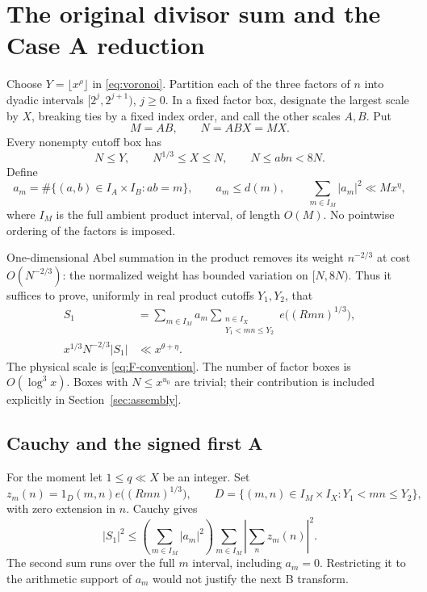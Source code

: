 \documentclass[11pt,a4paper]{article}
\numberwithin{equation}{section}
\theoremstyle{remark}
\begin{document}
\section{The original divisor sum and the Case A reduction}
\label{sec:reduction}
Choose $Y=\lfloor x^\rho\rfloor$ in \eqref{eq:voronoi}. Partition each of
the three factors of $n$ into dyadic intervals $[2^j,2^{j+1})$, $j\ge0$.
In a fixed factor box, designate the largest scale by $X$, breaking ties
by a fixed index order, and call the other scales $A,B$. Put
\[
 M=AB,\qquad N=ABX=MX.
\]
Every nonempty cutoff box has
\begin{equation}\label{eq:box-range}
 N\le Y,\qquad N^{1/3}\le X\le N,
 \qquad N\le abn<8N.
\end{equation}
Define
\[
 a_m=\#\{(a,b)\in I_A\times I_B:ab=m\},
 \qquad a_m\le d(m),\qquad \sum_{m\in I_M}|a_m|^2\ll Mx^\eta,
\]
where $I_M$ is the full ambient product interval, of length $O(M)$.
No pointwise ordering of the factors is imposed.

One-dimensional Abel summation in the product removes its weight
$n^{-2/3}$ at cost $O(N^{-2/3})$: the normalized weight has bounded
variation on $[N,8N)$. Thus it suffices to prove, uniformly in real product
cutoffs $Y_1,Y_2$, that
\begin{align}
 S_1&=\sum_{m\in I_M}a_m
       \sum_{\substack{n\in I_X\\Y_1<mn\le Y_2}}
             e\bigl((Rmn)^{1/3}\bigr),\label{eq:S1}\\
 x^{1/3}N^{-2/3}|S_1|&\ll x^{\theta+\eta}.
       \label{eq:box-target}
\end{align}
The physical scale is \eqref{eq:F-convention}. The number of factor boxes
is $O(\log^3x)$. Boxes with $N\le x^{u_0}$ are trivial; their contribution
is included explicitly in Section~\ref{sec:assembly}.

\subsection{Cauchy and the signed first A}
For the moment let $1\le q\ll X$ be an integer. Set
\[
 z_m(n)=1_D(m,n)e\bigl((Rmn)^{1/3}\bigr),\qquad
 D=\{(m,n)\in I_M\times I_X:Y_1<mn\le Y_2\},
\]
with zero extension in $n$. Cauchy gives
\begin{equation}\label{eq:full-Cauchy}
 |S_1|^2\le\left(\sum_{m\in I_M}|a_m|^2\right)
        \sum_{m\in I_M}\left|\sum_n z_m(n)\right|^2.
\end{equation}
The second sum runs over the full $m$ interval, including $a_m=0$.
Restricting it to the arithmetic support of $a_m$ would not justify the
next B transform.
\end{document}
